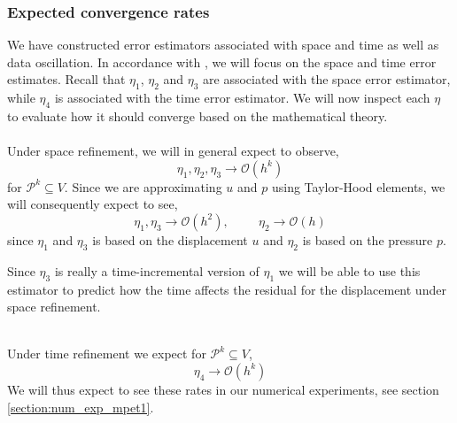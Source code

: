 \subsubsection{Expected convergence rates}
We have constructed error estimators associated with space and time as well as data oscillation. In accordance with \cite{meunier}, we will focus on the space and time error estimates. Recall that $\eta_1$, $\eta_2$ and $\eta_3$ are associated with the space error estimator, while $\eta_4$ is associated with the time error estimator. We will now inspect each $\eta$ to evaluate how it should converge based on the mathematical theory. 
\\
\\
Under space refinement, we will in general expect to observe, 
\begin{equation*}
\eta_1, \eta_2, \eta_3 \rightarrow \mathcal{O}(h^k)
\end{equation*}
for $\mathcal{P}^k \subseteq V$. Since we are approximating $u$ and $p$ using Taylor-Hood elements, we will consequently expect to see,
\begin{equation*}
\eta_1, \eta_3 \rightarrow \mathcal{O}(h^2), \hspace{1cm} \eta_2 \rightarrow \mathcal{O}(h)
\end{equation*}
since $\eta_1$ and $\eta_3$ is based on the displacement $u$ and $\eta_2$ is based on the pressure $p$. 
\begin{remark}
Since $\eta_3$ is really a time-incremental version of $\eta_1$ we will be able to use this estimator to predict how the time affects the residual for the displacement under space refinement. 
\end{remark}
\mbox{}\\
Under time refinement we expect for $\mathcal{P}^k \subseteq V$,
\begin{equation*}
\eta_4 \rightarrow \mathcal{O}(h^k)
\end{equation*}
We will thus expect to see these rates in our numerical experiments, see section \ref{section:num_exp_mpet1}. 
